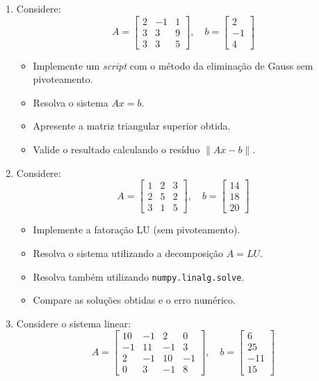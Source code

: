 \begin{enumerate}[label=\thesection.\arabic*]
\item Considere:
\[
A =
\begin{bmatrix}
2 & -1 & 1 \\
3 & 3 & 9 \\
3 & 3 & 5
\end{bmatrix},
\quad
b =
\begin{bmatrix}
2 \\ -1 \\ 4
\end{bmatrix}
\]

\begin{itemize}
    \item Implemente um \textit{script} com o método da eliminação de Gauss sem pivoteamento.
    \item Resolva o sistema $Ax = b$.
    \item Apresente a matriz triangular superior obtida.
    \item Valide o resultado calculando o resíduo $\|Ax - b\|$.
\end{itemize}

\item Considere:
\[
A =
\begin{bmatrix}
1 & 2 & 3 \\
2 & 5 & 2 \\
3 & 1 & 5
\end{bmatrix},
\quad
b =
\begin{bmatrix}
14 \\ 18 \\ 20
\end{bmatrix}
\]

\begin{itemize}
    \item Implemente a fatoração LU (sem pivoteamento).
    \item Resolva o sistema utilizando a decomposição $A = LU$.
    \item Resolva também utilizando \texttt{numpy.linalg.solve}.
    \item Compare as soluções obtidas e o erro numérico.
\end{itemize}

\item Considere o sistema linear:
\[
A =
\begin{bmatrix}
10 & -1 & 2 & 0 \\
-1 & 11 & -1 & 3 \\
2 & -1 & 10 & -1 \\
0 & 3 & -1 & 8
\end{bmatrix},
\quad
b =
\begin{bmatrix}
6 \\ 25 \\ -11 \\ 15
\end{bmatrix}
\]


\end{enumerate}
